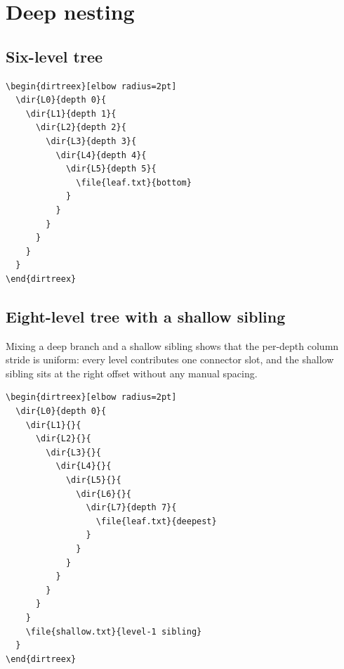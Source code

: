 \documentclass[11pt]{article}
\begin{document}
\clearpage

\section{Deep nesting}

\subsection{Six-level tree}

\begin{Verbatim}
\begin{dirtreex}[elbow radius=2pt]
  \dir{L0}{depth 0}{
    \dir{L1}{depth 1}{
      \dir{L2}{depth 2}{
        \dir{L3}{depth 3}{
          \dir{L4}{depth 4}{
            \dir{L5}{depth 5}{
              \file{leaf.txt}{bottom}
            }
          }
        }
      }
    }
  }
\end{dirtreex}
\end{Verbatim}

\begin{dirtreex}[elbow radius=2pt]
\end{dirtreex}

\subsection{Eight-level tree with a shallow sibling}

Mixing a deep branch and a shallow sibling shows that the per-depth column stride is uniform: every level contributes one connector slot, and the shallow sibling sits at the right offset without any manual spacing.

\begin{Verbatim}
\begin{dirtreex}[elbow radius=2pt]
  \dir{L0}{depth 0}{
    \dir{L1}{}{
      \dir{L2}{}{
        \dir{L3}{}{
          \dir{L4}{}{
            \dir{L5}{}{
              \dir{L6}{}{
                \dir{L7}{depth 7}{
                  \file{leaf.txt}{deepest}
                }
              }
            }
          }
        }
      }
    }
    \file{shallow.txt}{level-1 sibling}
  }
\end{dirtreex}
\end{Verbatim}
\end{document}
